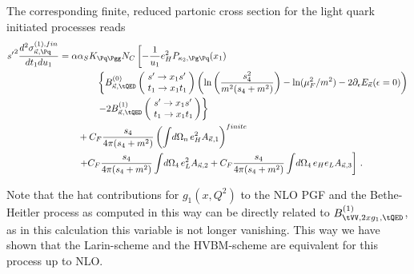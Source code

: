 The corresponding finite, reduced partonic cross section for the light quark initiated processes reads
\begin{align}
{s'}^2\frac{d^2\sigma_{\vec \kappa,\Pq}^{(1),fin}}{dt_1du_1} &=\alpha\alpha_SK_{\Pq\Pgg}N_C\left[-\frac 1 {u_1}e_H^2P_{\kappa_2,\Pg\Pq}(x_1)\right. \nonumber\\
 &\hspace{40pt}\left\{B^{(0)}_{\vec \kappa,\tQED}\left(\!\begin{array}{l}s'\rightarrow x_1s'\\t_1\rightarrow x_1 t_1\end{array}\!\!\right) \left(\ln\left(\frac{s_4^2}{m^2(s_4+m^2)}\right)-\ln(\mu_F^2/m^2)-2\partial_\epsilon E_{\vec \kappa}(\epsilon=0)\right)\right. \nonumber\\
 &\hspace{40pt}\left.-2 B^{(1)}_{\vec \kappa,\tQED}\left(\!\begin{array}{l}s'\rightarrow x_1s'\\t_1\rightarrow x_1 t_1\end{array}\!\!\right)\right\} \nonumber\\
 &\hspace{20pt}+C_F\frac{s_4}{4\pi(s_4+m^2)}\left(\int\!d\Omega_n\,e_H^2A_{\vec \kappa,1}\right)^{finite} \nonumber\\
 &\hspace{20pt}\left.+C_F\frac{s_4}{4\pi(s_4+m^2)}\int\!d\Omega_4\,e_L^2A_{\vec \kappa,2} +C_F\frac{s_4}{4\pi(s_4+m^2)}\int\!d\Omega_4\,e_H e_L A_{\vec \kappa,3} \right] \label{eq:qfinal}\,.
\end{align}

Note that the hat contributions for $g_1(x,Q^2)$ to the NLO PGF and the Bethe-Heitler process as computed in \cite{Hekhorn:2018ywm} this way can be directly related to $B^{(1)}_{\tVV,2xg_1,\tQED}$, as in this calculation this variable is not longer vanishing. This way we have shown that the Larin-scheme and the HVBM-scheme are equivalent for this process up to NLO.
